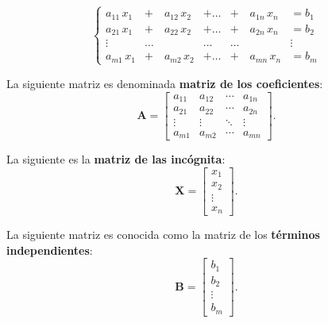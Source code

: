 \documentclass[11pt]{article}
\newcounter{teo}%
\begin{document}
\begin{mdframed}[style= teoSty,frametitle={Definición:  {\it Dado un sistema de ecuaciones de $m$ ecuaciones y $n$ incógnita.
} }]

\vspace{-3mm}$$\left\lbrace 
\begin{matrix}
      a_{11}\, x_1 & +\quad a_{12}\, x_2 & + \dots & +\quad a_{1n}\, x_n & = b_1 \\
      a_{21}\, x_1 & +\quad a_{22}\, x_2 & + \dots & +\quad a_{2n}\, x_n & = b_2 \\
      \vdots     & \dots       & \dots   & \dots       & \vdots \\
      a_{m1}\, x_1 & +\quad a_{m2}\, x_2 & + \dots & +\quad a_{mn}\, x_n & = b_m
   \end{matrix} \right. 
$$
\vspace{-3mm}
\begin{itemize}
    
\begin{minipage}{.4\textwidth}
\item  La  siguiente matriz es denominada  {\bf matriz de los coeficientes}:\\
\[\mathbf{A}= \begin{bmatrix}
a_{11} & a_{12} & \cdots & a_{1n} \\
a_{21} & a_{22} & \cdots & a_{2n} \\
\vdots & \vdots & \ddots & \vdots \\
a_{m1} & a_{m2} & \cdots & a_{mn}
\end{bmatrix} .
\]
\end{minipage}\qquad\qquad\begin{minipage}{.4\textwidth}
\item  La siguiente es la {\bf matriz de las incógnita}:\\ 
\vspace{-6mm}
\[\mathbf{X}= \begin{bmatrix}
x_1 \\
x_2 \\
\vdots \\
x_n
\end{bmatrix}.
\]
\end{minipage}


\begin{minipage}{.4\textwidth}
\item  La siguiente matriz es conocida como la matriz de los {\bf términos independientes}:  \[ \mathbf{B} = \begin{bmatrix}
b_1 \\
b_2 \\
\vdots \\
b_m
\end{bmatrix}. \]


\end{minipage}
\end{itemize}
\end{mdframed}
\end{document}
